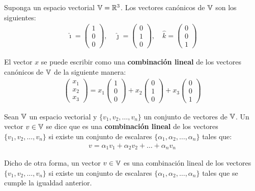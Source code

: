 \begin{definition}
{
    Suponga un espacio vectorial $\mathbb{V} = \mathbb{R}^3$. Los vectores canónicos de $\mathbb{V}$ son los siguientes:
    \begin{align*}
        \hat{\imath} = \begin{pmatrix}
            1 \\
            0 \\
            0
        \end{pmatrix}, \quad
        \hat{\jmath} = \begin{pmatrix}
            0 \\
            1 \\
            0
        \end{pmatrix}, \quad
        \hat{k} = \begin{pmatrix}
            0 \\
            0 \\
            1
        \end{pmatrix}
    \end{align*}
}
\end{definition}

El vector $x$ se puede escribir como una \textbf{combinación lineal} de los vectores canónicos de $\mathbb{V}$ de la siguiente manera:
\begin{align*}
    \begin{pmatrix}
        x_1 \\
        x_2 \\
        x_3
    \end{pmatrix} = x_1 \begin{pmatrix}
        1 \\
        0 \\
        0
    \end{pmatrix} + x_2 \begin{pmatrix}
        0 \\
        1 \\
        0
    \end{pmatrix} + x_3 \begin{pmatrix}
        0 \\
        0 \\
        1
    \end{pmatrix}
\end{align*}

\begin{definition}
{
    Sean $\mathbb{V}$ un espacio vectorial y $\{ v_1, v_2, \dots, v_n \}$ un conjunto de vectores de $\mathbb{V}$. Un vector $v \in \mathbb{V}$ se dice que es una \textbf{combinación lineal} de los vectores $\{ v_1, v_2, \dots, v_n \}$ si existe un conjunto de escalares $\{ \alpha_1, \alpha_2, \dots, \alpha_n \}$ tales que:
    \begin{align*}
        v = \alpha_1 v_1 + \alpha_2 v_2 + \dots + \alpha_n v_n
    \end{align*}

    Dicho de otra forma, un vector $v \in \mathbb{V}$ es una combinación lineal de los vectores $\{ v_1, v_2, \dots, v_n \}$ si existe un conjunto de escalares $\{ \alpha_1, \alpha_2, \dots, \alpha_n \}$ tales que se cumple la igualdad anterior.
}
\end{definition}

